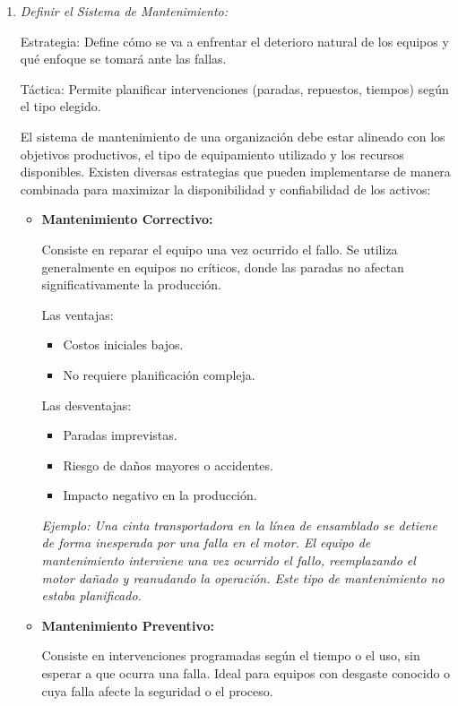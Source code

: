 \documentclass[a4paper,oneside,11pt]{article}
\begin{document}
\begin{enumerate}
    \item \textit{Definir el Sistema de Mantenimiento:}

    Estrategia: Define cómo se va a enfrentar el deterioro natural de los equipos y qué enfoque se tomará ante las fallas.

    Táctica: Permite planificar intervenciones (paradas, repuestos, tiempos) según el tipo elegido.

    El sistema de mantenimiento de una organización debe estar alineado con los objetivos productivos, el tipo de equipamiento utilizado y los recursos disponibles. Existen diversas estrategias que pueden implementarse de manera combinada para maximizar la disponibilidad y confiabilidad de los activos:
    \begin{itemize}
        \item \textbf{Mantenimiento Correctivo:}

        Consiste en reparar el equipo una vez ocurrido el fallo. Se utiliza generalmente en equipos no críticos, donde las paradas no afectan significativamente la producción.
        
        Las ventajas:
        \begin{itemize}
            \item Costos iniciales bajos.
            \item No requiere planificación compleja.
        \end{itemize}
        Las desventajas:
        \begin{itemize}
            \item Paradas imprevistas.
            \item Riesgo de daños mayores o accidentes.
            \item Impacto negativo en la producción.
        \end{itemize}
        
        \textit{Ejemplo: Una cinta transportadora en la línea de ensamblado se detiene de forma inesperada por una falla en el motor. El equipo de mantenimiento interviene una vez ocurrido el fallo, reemplazando el motor dañado y reanudando la operación. Este tipo de mantenimiento no estaba planificado.}
        
        \item \textbf{Mantenimiento Preventivo:}

        Consiste en intervenciones programadas según el tiempo o el uso, sin esperar a que ocurra una falla. Ideal para equipos con desgaste conocido o cuya falla afecte la seguridad o el proceso.


\end{itemize}
\end{enumerate}
\end{document}
